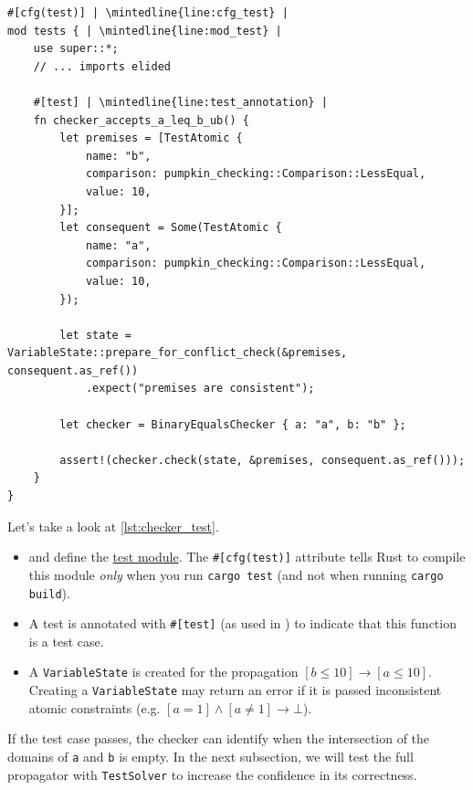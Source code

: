 \documentclass{article}
\begin{document}
\begin{listing}[H]
\begin{verbatim}
#[cfg(test)] | \mintedline{line:cfg_test} |
mod tests { | \mintedline{line:mod_test} |
    use super::*;
    // ... imports elided

    #[test] | \mintedline{line:test_annotation} |
    fn checker_accepts_a_leq_b_ub() {
        let premises = [TestAtomic {
            name: "b",
            comparison: pumpkin_checking::Comparison::LessEqual,
            value: 10,
        }];
        let consequent = Some(TestAtomic {
            name: "a",
            comparison: pumpkin_checking::Comparison::LessEqual,
            value: 10,
        });

        let state = VariableState::prepare_for_conflict_check(&premises, consequent.as_ref())
            .expect("premises are consistent");

        let checker = BinaryEqualsChecker { a: "a", b: "b" };

        assert!(checker.check(state, &premises, consequent.as_ref()));
    }
}
\end{verbatim}
\caption{A unit test for \texttt{BinaryEqualsChecker}}
\label{lst:checker_test}
\end{listing}
Let's take a look at \autoref{lst:checker_test}.
\begin{itemize}
    \item
         and  define the \href{https://doc.rust-lang.org/book/ch11-03-test-organization.html#the-tests-module-and-cfgtest}{test module}.
        The \texttt{#[cfg(test)]} attribute tells Rust to compile this module \textit{only} when you run \texttt{cargo test} (and not when running \texttt{cargo build}).
    \item
        A test is annotated with \texttt{#[test]} (as used in ) to indicate that this function is a test case.

    \item
        A \texttt{VariableState} is created for the propagation $[b \le 10] \rightarrow [a \le 10]$.
        Creating a \texttt{VariableState} may return an error if it is passed inconsistent atomic constraints (e.g. $[a = 1] \land [a \neq 1] \rightarrow \bot$).
\end{itemize}

If the test case passes, the checker can identify when the intersection of the domains of \texttt{a} and \texttt{b} is empty.
In the next subsection, we will test the full propagator with \texttt{TestSolver} to increase the confidence in its correctness.
\end{document}
